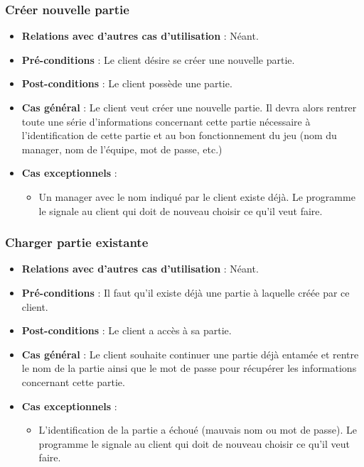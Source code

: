 \documentclass[a4paper,titlepage]{scrreprt}
\begin{document}
    \subsubsection{Créer nouvelle partie}
      \begin{itemize}
        \item \textbf{Relations avec d'autres cas d'utilisation}  : Néant.
        \item \textbf{Pré-conditions} : Le client désire se créer une nouvelle partie.
        \item \textbf{Post-conditions} : Le client possède une partie.
        \item \textbf{Cas général} : Le client veut créer une nouvelle partie. Il devra alors rentrer toute une série d’informations concernant cette partie nécessaire à l’identification de cette partie et au bon fonctionnement du jeu (nom du manager, nom de l’équipe, mot de passe, etc.)
        \item \textbf{Cas exceptionnels} :
          \begin{itemize}
            \item Un manager avec le nom indiqué par le client existe déjà. Le programme le signale au client qui doit de nouveau choisir ce qu'il veut faire.
          \end{itemize}
      \end{itemize}
    \subsubsection{Charger partie existante}
      \begin{itemize}
        \item \textbf{Relations avec d'autres cas d'utilisation}  : Néant.
        \item \textbf{Pré-conditions} : Il faut qu’il existe déjà une partie à laquelle créée par ce client.
        \item \textbf{Post-conditions} : Le client a accès à sa partie.
        \item \textbf{Cas général} : Le client souhaite continuer une partie déjà entamée et rentre le nom de la partie ainsi que le mot de passe pour récupérer les informations concernant cette partie.
        \item \textbf{Cas exceptionnels} :
          \begin{itemize}
			\item L’identification de la partie a échoué (mauvais nom ou mot de passe). Le programme le signale au client qui doit de nouveau choisir ce qu'il veut faire.
          \end{itemize}
      \end{itemize}
\end{document}
